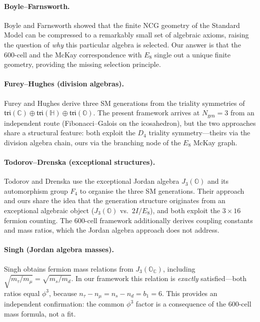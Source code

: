 \documentclass[12pt,a4paper]{article}
\theoremstyle{definition}
\begin{document}
\paragraph{Boyle--Farnsworth.}
Boyle and Farnsworth showed that the finite NCG geometry of the Standard Model can be compressed to a remarkably small set of algebraic axioms, raising the question of \emph{why} this particular algebra is selected.  Our answer is that the 600-cell and the McKay correspondence with $E_8$ single out a unique finite geometry, providing the missing selection principle.

\paragraph{Furey--Hughes (division algebras).}
Furey and Hughes derive three SM generations from the triality symmetries of $\mathfrak{tri}(\mathbb{C}) \oplus \mathfrak{tri}(\mathbb{H}) \oplus \mathfrak{tri}(\mathbb{O})$.  The present framework arrives at $N_{\text{gen}} = 3$ from an independent route (Fibonacci--Galois on the icosahedron), but the two approaches share a structural feature: both exploit the $D_4$ triality symmetry---theirs via the division algebra chain, ours via the branching node of the $E_8$ McKay graph.

\paragraph{Todorov--Drenska (exceptional structures).}
Todorov and Drenska use the exceptional Jordan algebra $J_3(\mathbb{O})$ and its automorphism group $F_4$ to organise the three SM generations.  Their approach and ours share the idea that the generation structure originates from an exceptional algebraic object ($J_3(\mathbb{O})$ vs.\ $2I/E_8$), and both exploit the $3 \times 16$ fermion counting.  The 600-cell framework additionally derives coupling constants and mass ratios, which the Jordan algebra approach does not address.

\paragraph{Singh (Jordan algebra masses).}
Singh obtains fermion mass relations from $J_3(\mathbb{O}_{\mathbb{C}})$, including $\sqrt{m_\tau/m_\mu} = \sqrt{m_s/m_d}$.  In our framework this relation is \emph{exactly} satisfied---both ratios equal $\phi^3$, because $n_\tau - n_\mu = n_s - n_d = b_1 = 6$.  This provides an independent confirmation: the common $\phi^3$ factor is a consequence of the 600-cell mass formula, not a fit.
\end{document}

